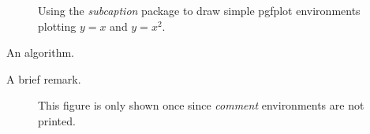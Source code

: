 \begin{figure}
    \centering
    \begin{subfigure}[b]{0.49\textwidth}
    \end{subfigure}
    \begin{subfigure}[b]{0.49\textwidth}
    \end{subfigure}
    \caption{Using the \emph{subcaption} package to draw simple pgfplot environments plotting $y=x$ and $y=x^2$.}
    \label{fig:pgfplot}
\end{figure}

\lipsum[18-19]

\begin{algorithm}[t]
 \SetAlgoLined
  \caption{An algorithm.} 
  \label{algo:algorithm}
\end{algorithm}

\lipsum[20-21]

\begin{remark}
    A brief remark.
\end{remark}

\lipsum[22-23]

\begin{comment}
    A comment block.
\end{comment}

\lipsum[24-25]

\begin{comment}
\begin{figure}[t]
    \centering
    
    \caption{A matrix $\mathbf{M}$.}
    \label{fig:matrix1}
\end{figure}
\end{comment}
\begin{figure}[t]
    \centering
    
    \caption{This figure is only shown once since \emph{comment} environments are not printed.}
    \label{fig:matrix2}
\end{figure}

